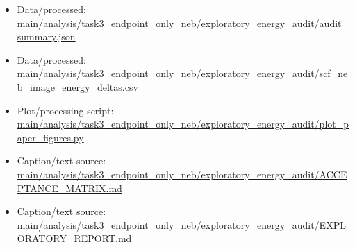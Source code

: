 \begin{itemize}[leftmargin=1.4em,noitemsep]
\item Data/processed: \begingroup\scriptsize\url{main/analysis/task3_endpoint_only_neb/exploratory_energy_audit/audit_summary.json}\endgroup
\item Data/processed: \begingroup\scriptsize\url{main/analysis/task3_endpoint_only_neb/exploratory_energy_audit/scf_neb_image_energy_deltas.csv}\endgroup
\item Plot/processing script: \begingroup\scriptsize\url{main/analysis/task3_endpoint_only_neb/exploratory_energy_audit/plot_paper_figures.py}\endgroup
\item Caption/text source: \begingroup\scriptsize\url{main/analysis/task3_endpoint_only_neb/exploratory_energy_audit/ACCEPTANCE_MATRIX.md}\endgroup
\item Caption/text source: \begingroup\scriptsize\url{main/analysis/task3_endpoint_only_neb/exploratory_energy_audit/EXPLORATORY_REPORT.md}\endgroup
\end{itemize}
